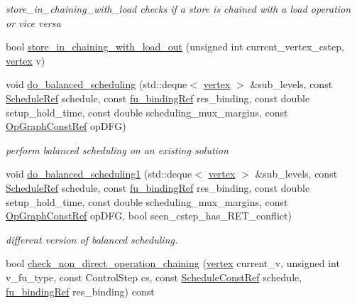 \begin{DoxyCompactItemize}
\begin{DoxyCompactList}\small\item\em store\+\_\+in\+\_\+chaining\+\_\+with\+\_\+load checks if a store is chained with a load operation or vice versa \end{DoxyCompactList}\item 
bool \hyperlink{classparametric__list__based_ae448d283c1cda365d88c00d67dd4e447}{store\+\_\+in\+\_\+chaining\+\_\+with\+\_\+load\+\_\+out} (unsigned int current\+\_\+vertex\+\_\+cstep, \hyperlink{graph_8hpp_abefdcf0544e601805af44eca032cca14}{vertex} v)
\item 
void \hyperlink{classparametric__list__based_a578ba2b5ccd255dc25d53274d3e301bc}{do\+\_\+balanced\+\_\+scheduling} (std\+::deque$<$ \hyperlink{graph_8hpp_abefdcf0544e601805af44eca032cca14}{vertex} $>$ \&sub\+\_\+levels, const \hyperlink{schedule_8hpp_af67f402958b3b52a1ec5cc4ce08ae3b9}{Schedule\+Ref} schedule, const \hyperlink{fu__binding_8hpp_a619181df8ab98d7b7e17de58ac44b065}{fu\+\_\+binding\+Ref} res\+\_\+binding, const double setup\+\_\+hold\+\_\+time, const double scheduling\+\_\+mux\+\_\+margins, const \hyperlink{op__graph_8hpp_a9a0b240622c47584bee6951a6f5de746}{Op\+Graph\+Const\+Ref} op\+D\+FG)
\begin{DoxyCompactList}\small\item\em perform balanced scheduling on an existing solution \end{DoxyCompactList}\item 
void \hyperlink{classparametric__list__based_a3015cd6577b9542929207800840b6acf}{do\+\_\+balanced\+\_\+scheduling1} (std\+::deque$<$ \hyperlink{graph_8hpp_abefdcf0544e601805af44eca032cca14}{vertex} $>$ \&sub\+\_\+levels, const \hyperlink{schedule_8hpp_af67f402958b3b52a1ec5cc4ce08ae3b9}{Schedule\+Ref} schedule, const \hyperlink{fu__binding_8hpp_a619181df8ab98d7b7e17de58ac44b065}{fu\+\_\+binding\+Ref} res\+\_\+binding, const double setup\+\_\+hold\+\_\+time, const double scheduling\+\_\+mux\+\_\+margins, const \hyperlink{op__graph_8hpp_a9a0b240622c47584bee6951a6f5de746}{Op\+Graph\+Const\+Ref} op\+D\+FG, bool seen\+\_\+cstep\+\_\+has\+\_\+\+R\+E\+T\+\_\+conflict)
\begin{DoxyCompactList}\small\item\em different version of balanced scheduling. \end{DoxyCompactList}\item 
bool \hyperlink{classparametric__list__based_a6457256257347530f45f19ca4b85b6bc}{check\+\_\+non\+\_\+direct\+\_\+operation\+\_\+chaining} (\hyperlink{graph_8hpp_abefdcf0544e601805af44eca032cca14}{vertex} current\+\_\+v, unsigned int v\+\_\+fu\+\_\+type, const Control\+Step cs, const \hyperlink{schedule_8hpp_a85e4dea8a1611026193d8ca13fc5a260}{Schedule\+Const\+Ref} schedule, \hyperlink{fu__binding_8hpp_a619181df8ab98d7b7e17de58ac44b065}{fu\+\_\+binding\+Ref} res\+\_\+binding) const

\end{DoxyCompactItemize}
